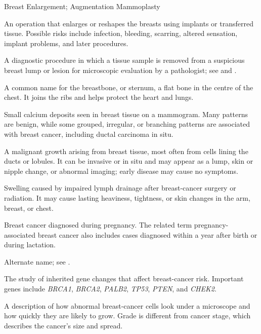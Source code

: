 \synonyms
Breast Enlargement; Augmentation Mammoplasty

 An operation that enlarges or reshapes the breasts using implants or transferred tissue. Possible risks include infection, bleeding, scarring, altered sensation, implant problems, and later procedures.

 A diagnostic procedure in which a tissue sample is removed from a suspicious breast lump or lesion for microscopic evaluation by a pathologist; see  and .

 A common name for the breastbone, or sternum, a flat bone in the centre of the chest. It joins the ribs and helps protect the heart and lungs.

 Small calcium deposits seen in breast tissue
on a mammogram. Many patterns are benign, while some grouped, irregular, or
branching patterns are associated with breast cancer, including ductal
carcinoma in situ.

 A malignant growth arising from breast tissue, most
often from cells lining the ducts or lobules. It can be invasive or in situ
and may appear as a lump, skin or nipple change, or abnormal imaging; early
disease may cause no symptoms.

 Swelling caused by impaired lymph
drainage after breast-cancer surgery or radiation. It may cause lasting
heaviness, tightness, or skin changes in the arm, breast, or chest.

 Breast cancer diagnosed during pregnancy. The related term pregnancy-associated breast cancer also includes cases diagnosed within a year after birth or during lactation.

 Alternate name; see .

 The study of inherited gene changes that affect breast-cancer risk. Important genes include \textit{BRCA1}, \textit{BRCA2}, \textit{PALB2}, \textit{TP53}, \textit{PTEN}, and \textit{CHEK2}.

 A description of how abnormal breast-cancer cells look under a microscope and how quickly they are likely to grow. Grade is different from cancer stage, which describes the cancer's size and spread.

